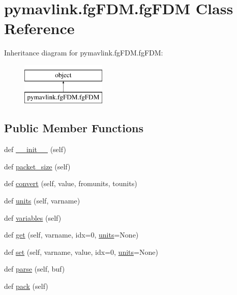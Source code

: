 \hypertarget{classpymavlink_1_1fgFDM_1_1fgFDM}{}\section{pymavlink.\+fg\+F\+D\+M.\+fg\+F\+DM Class Reference}
\label{classpymavlink_1_1fgFDM_1_1fgFDM}
Inheritance diagram for pymavlink.\+fg\+F\+D\+M.\+fg\+F\+DM\+:\begin{figure}[H]
\begin{center}
\leavevmode
\includegraphics[height=2.000000cm]{classpymavlink_1_1fgFDM_1_1fgFDM}
\end{center}
\end{figure}
\subsection*{Public Member Functions}
\begin{DoxyCompactItemize}
\item 
def \mbox{\hyperlink{classpymavlink_1_1fgFDM_1_1fgFDM_ac2108e870de5be20a8352a314358391c}{\+\_\+\+\_\+init\+\_\+\+\_\+}} (self)
\item 
def \mbox{\hyperlink{classpymavlink_1_1fgFDM_1_1fgFDM_ad993e23d6056391321aad8c6d4212d74}{packet\+\_\+size}} (self)
\item 
def \mbox{\hyperlink{classpymavlink_1_1fgFDM_1_1fgFDM_a3b8200822cb649c87cda6d625a168871}{convert}} (self, value, fromunits, tounits)
\item 
def \mbox{\hyperlink{classpymavlink_1_1fgFDM_1_1fgFDM_a57c41f1b87ecb4bff8d40e63cf7ba6d5}{units}} (self, varname)
\item 
def \mbox{\hyperlink{classpymavlink_1_1fgFDM_1_1fgFDM_ae0756cde090c7a8a0cf9c08a6cbd700e}{variables}} (self)
\item 
def \mbox{\hyperlink{classpymavlink_1_1fgFDM_1_1fgFDM_a0d1625275f9a8c52f3b11bd403b29c4a}{get}} (self, varname, idx=0, \mbox{\hyperlink{classpymavlink_1_1fgFDM_1_1fgFDM_a57c41f1b87ecb4bff8d40e63cf7ba6d5}{units}}=None)
\item 
def \mbox{\hyperlink{classpymavlink_1_1fgFDM_1_1fgFDM_a850f093cb48104e97a5176e79390ac85}{set}} (self, varname, value, idx=0, \mbox{\hyperlink{classpymavlink_1_1fgFDM_1_1fgFDM_a57c41f1b87ecb4bff8d40e63cf7ba6d5}{units}}=None)
\item 
def \mbox{\hyperlink{classpymavlink_1_1fgFDM_1_1fgFDM_a706a022185739c6b22a0e5ccdaedf886}{parse}} (self, buf)
\item 
def \mbox{\hyperlink{classpymavlink_1_1fgFDM_1_1fgFDM_aafa38ce5a7b2976d4ad3ef0d2615df89}{pack}} (self)
\end{DoxyCompactItemize}
